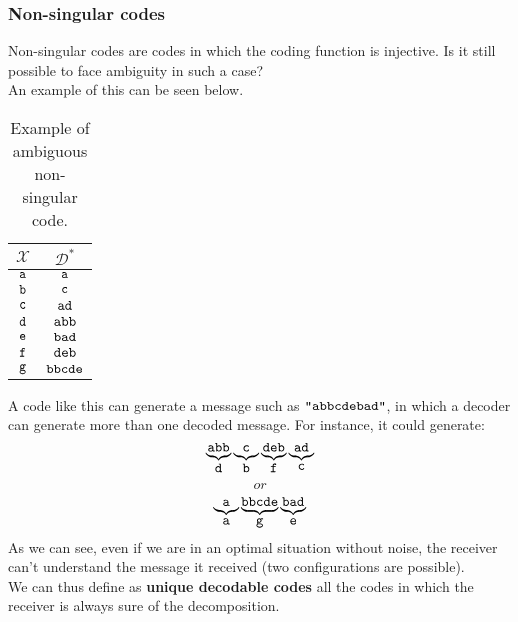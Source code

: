 \subsubsection{Non-singular codes}
Non-singular codes are codes in which the coding function is injective. Is it still possible to face ambiguity in such a case?\\
An example of this can be seen below.
\begin{table}[H]
	\centering
	\begin{tabular}{| c | c |}
		\hline
		$\mathcal{X}$ & $\mathcal{D}^*$\\\hline
		$\verb|a|$ & $\verb|a|$ \\
		$\verb|b|$ & $\verb|c|$ \\
		$\verb|c|$ & $\verb|ad|$ \\
		$\verb|d|$ & $\verb|abb|$ \\
		$\verb|e|$ & $\verb|bad|$ \\
		$\verb|f|$ & $\verb|deb|$ \\
		$\verb|g|$ & $\verb|bbcde|$ \\
		\hline
	\end{tabular}
	\caption{Example of ambiguous non-singular code.}
\end{table}
\par
A code like this can generate a message such as $\verb|"abbcdebad"|$, in which a decoder can generate more than one decoded message. For instance, it could generate:
$$\underbrace{\texttt{abb}}_{\verb|d|}\underbrace{\texttt{c}}_{\verb|b|}\underbrace{\texttt{deb}}_{\verb|f|}\underbrace{\texttt{ad}}_{\verb|c|}$$
$$or$$
$$\underbrace{\texttt{a}}_{\verb|a|}\underbrace{\texttt{bbcde}}_{\verb|g|}\underbrace{\texttt{bad}}_{\verb|e|}$$
As we can see, even if we are in an optimal situation without noise, the receiver can't understand the message it received (two configurations are possible).\\
We can thus define as \textbf{unique decodable codes} all the codes in which the receiver is always sure of the decomposition.

